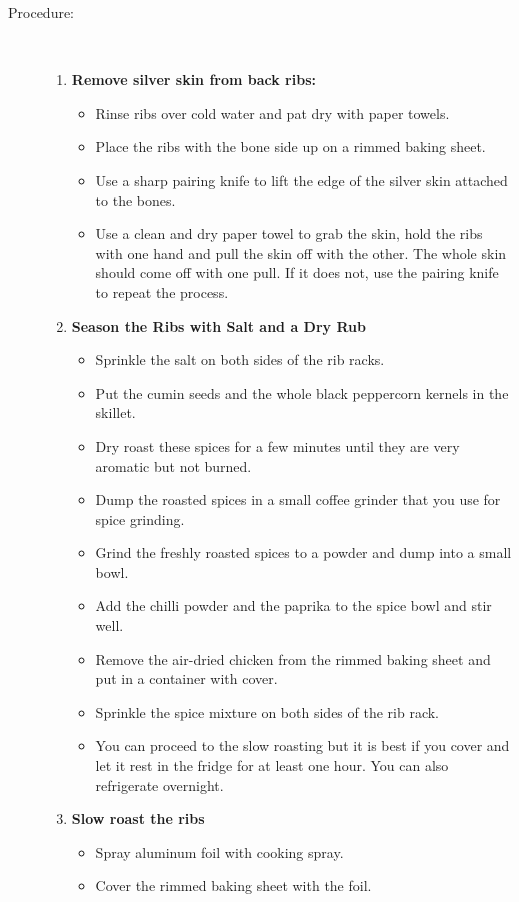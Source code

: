 \documentclass [11pt, letterpaper] {article}
\begin{document}
\begin{description}
\item[Procedure:]\ \\
	\begin{enumerate}
	\item {\bf Remove silver skin from back ribs:}
		\begin{itemize}
		\item Rinse ribs over cold water and pat dry with paper towels.
		\item Place the ribs with the bone side up on a rimmed baking sheet.
		\item Use a sharp pairing knife to lift the edge of the silver skin attached to the bones. 
		\item Use a clean and dry paper towel to grab the skin, hold the ribs with one hand and pull the skin off with the other. The whole skin should come off with one pull. If it does not, use the pairing knife to repeat the process.
		\end{itemize}
	\item {\bf Season the Ribs with Salt and a Dry Rub}
		\begin{itemize}
		\item Sprinkle the salt on both sides of the rib racks.
		\item Put the cumin seeds and the whole black peppercorn kernels in the skillet.
		\item Dry roast these spices for a few minutes until they are very aromatic but not burned.
		\item Dump the roasted spices in a small coffee grinder that you use for spice grinding.
		\item Grind the freshly roasted spices to a powder and dump into a small bowl.
		\item Add the chilli powder and the paprika to the spice bowl and stir well.
		\item Remove the air-dried chicken from the rimmed baking sheet and put in a container with cover.
		\item Sprinkle the spice mixture on both sides of the rib rack. 
		\item You can proceed to the slow roasting but it is best if you cover and let it rest in the fridge for at least one hour. You can also refrigerate overnight.
		\end{itemize}
	\item {\bf Slow roast the ribs}
		\begin{itemize}
	        \item Spray aluminum foil with cooking spray.
		\item Cover the rimmed baking sheet with the foil.

\end{itemize}
\end{enumerate}
\end{description}
\end{document}

